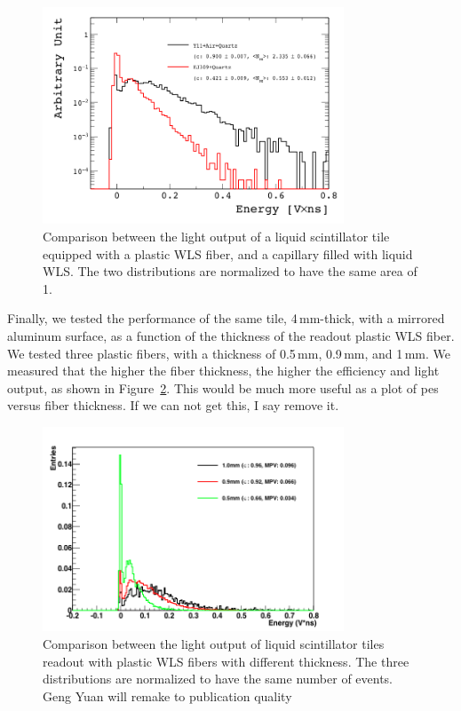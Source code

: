 \documentclass[review]{elsarticle}
\begin{document}
\begin{figure}[!ht]
\begin{center}
\includegraphics[width=0.8\textwidth]{./figures/list_RO_FIBER_all_norm.png}
\caption{Comparison between the light output of a liquid scintillator
  tile equipped with a plastic WLS fiber, and a capillary filled with
  liquid WLS. The two distributions are normalized to have the same area of 1.}
\label{fig:y11_vs_cap}
\end{center}
\end{figure}




Finally, we tested the performance of the same tile, 4\,mm-thick, with a
mirrored aluminum surface, as a function of the thickness of the
readout plastic WLS fiber. We tested three plastic fibers, with a
thickness of 0.5\,mm, 0.9\,mm, and 1\,mm. We measured that the higher the
fiber thickness, the higher the efficiency and light output, as shown
in Figure~\ref{fig:fiber_thickness_comp}.
{\Large \color{red} This would be much more useful as a plot of pes versus fiber thickness.  If we can not get this, I say remove it.}

\begin{figure}[!ht]
\begin{center}
\includegraphics[width=0.8\textwidth]{./figures/list_Fiber_Thickness_all_1.png}
\caption{Comparison between the light output of liquid scintillator
  tiles readout with plastic WLS fibers with different thickness. The
  three distributions are normalized to have the same number of
  events.{\color{red} Geng Yuan will remake to publication quality}}
\label{fig:fiber_thickness_comp}
\end{center}
\end{figure}
\end{document}
